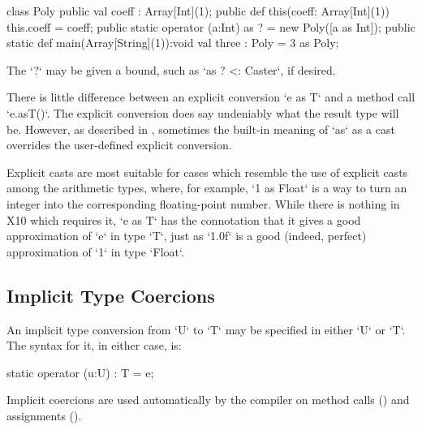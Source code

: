 \begin{ex}
\begin{xten}
class Poly {
  public val coeff : Array[Int](1);
  public def this(coeff: Array[Int](1)) { this.coeff = coeff;}
  public static operator (a:Int) as ? = new Poly([a as Int]);
  public static def main(Array[String](1)):void {
     val three : Poly = 3 as Poly;
  }
}
\end{xten}
%
\end{ex}


The \xcd`?` may be given a bound, such as \xcd`as ? <: Caster`, if desired.
  

There is little difference between an explicit conversion \xcd`e as T` and a
method call \xcd`e.asT()`.  The explicit conversion does say undeniably what
the result type will be.  However, as described in ,
sometimes the built-in meaning of \xcd`as` as a cast overrides the
user-defined explicit conversion.  

Explicit casts are most suitable for cases
which resemble the use of explicit casts among the arithmetic types, where, 
for example, \xcd`1 as Float` is a way to turn an integer into the
corresponding floating-point number.  
While there is nothing in X10 which
requires it, \xcd`e as T` has the connotation that it gives a good
approximation of \xcd`e` in type \xcd`T`, just as \xcd`1.0f` is a good
(indeed, perfect) approximation of \xcd`1` in type \xcd`Float`.  

\subsection{Implicit Type Coercions}
\label{sect:ImplicitCoercion}

An implicit type conversion from \xcd`U`  to \xcd`T` may be specified in
either \xcd`U` or \xcd`T`.  
The syntax for it, in either case, is: 
\begin{xten}
static operator (u:U) : T = e;
\end{xten}




Implicit coercions are used automatically by the compiler on method calls 
() and assignments ().



